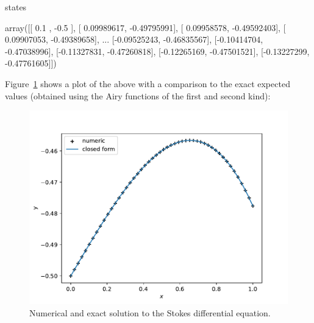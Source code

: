 \begin{pyin}
states
\end{pyin}





\begin{raw}
array([[ 0.1       , -0.5       ],
       [ 0.09989617, -0.49795991],
       [ 0.09958578, -0.49592403],
       [ 0.09907053, -0.49389658],
       ...
       [-0.09525243, -0.46835567],
       [-0.10414704, -0.47038996],
       [-0.11327831, -0.47260818],
       [-0.12265169, -0.47501521],
       [-0.13227299, -0.47761605]])
\end{raw}






Figure~\ref{fig:odeint_comparison_plot} shows a plot of the above with a comparison to the exact expected values (obtained
using the Airy functions of the first and second kind):


\begin{figure}[!htbp]
\begin{center}
\includegraphics[width=.7\textwidth]{./assets/odeint_comparison_plot/main.pdf}
    \caption{Numerical and exact solution to the Stokes differential equation.}
    \label{fig:odeint_comparison_plot}
\end{center}
\end{figure}

